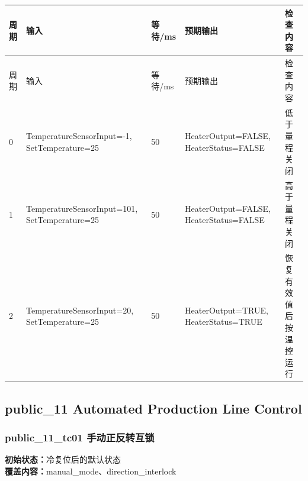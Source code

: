 \begin{longtable}{L{1.0cm}L{4.7cm}L{1.4cm}L{4.0cm}L{2.1cm}}

\toprule

周期 & 输入 & 等待/ms & 预期输出 & 检查内容\\

\midrule

\endfirsthead

\toprule

周期 & 输入 & 等待/ms & 预期输出 & 检查内容\\

\midrule

\endhead

0 & TemperatureSensorInput=-1, SetTemperature=25 & 50 & HeaterOutput=FALSE, HeaterStatus=FALSE & 低于量程关闭\\

1 & TemperatureSensorInput=101, SetTemperature=25 & 50 & HeaterOutput=FALSE, HeaterStatus=FALSE & 高于量程关闭\\

2 & TemperatureSensorInput=20, SetTemperature=25 & 50 & HeaterOutput=TRUE, HeaterStatus=TRUE & 恢复有效值后按温控运行\\

\bottomrule

\end{longtable}

\subsection{{\ttfamily public\_11} Automated Production Line Control}

\subsubsection{{\ttfamily public\_11\_tc01} 手动正反转互锁}

\noindent\textbf{初始状态：}冷复位后的默认状态\\

\textbf{覆盖内容：}manual\_mode、direction\_interlock

